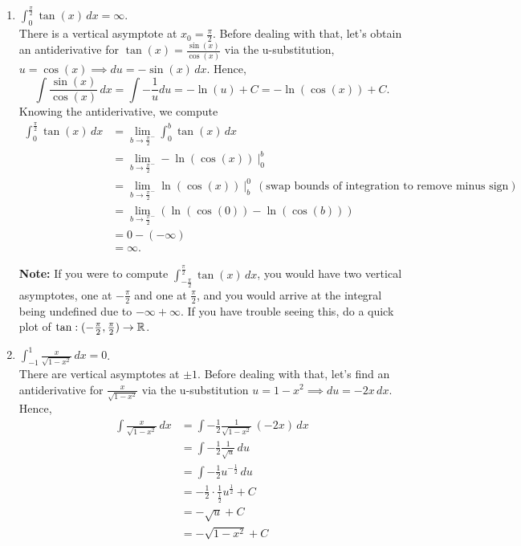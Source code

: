 \begin{enumerate}
    \item \Ans \quad  $\int_0 ^\frac{\pi}{2} \tan(x) \, dx =\infty$. \\

    There is a vertical asymptote at $x_0 = \frac{\pi}{2}$. Before dealing with that, let's obtain an antiderivative for $\tan(x) = \frac{\sin(x)}{\cos(x)}$ via the u-substitution, $u = \cos(x) \implies du = -\sin(x) \, dx$. Hence,
    $$ \int \frac{\sin(x)}{\cos(x)}\, dx = \int -\frac{1}{u} du = -\ln(u) +C = -\ln(\cos(x)) + C.$$
    Knowing the antiderivative, we compute
    \begin{align*}
        \int_{0}^{ \frac{\pi}{2} } \tan(x) \, dx &= \lim_{ b \to \frac{\pi}{2}^- }  \int_{0}^{b} \tan(x) \, dx  \\[1em] 
        &= \lim_{ b \to \frac{\pi}{2}^- }  -\ln(\cos(x)) ~\bigg|_{0}^{b} \\[1em]
         &= \lim_{b \to \frac{\pi}{2}^-}  \ln(\cos(x)) ~\bigg|_{b}^0 ~~(\text{swap bounds of integration to remove minus sign}) \\[1em]
         &=  \lim_{b \to \frac{\pi}{2}^-} \left( \ln(\cos(0))  - \ln(\cos(b))  \right) \\[1em]
         &= 0 - (-\infty)\\
         &=\infty.         
    \end{align*}

    \textbf{Note:} If you were to compute $\displaystyle \int_{-\frac{\pi}{2}}^{ \frac{\pi}{2} } \tan(x) \, dx $, you would have two vertical asymptotes, one at $ -\frac{\pi}{2}$ and one at  $ \frac{\pi}{2}$, and you would arrive at the integral being undefined due to $-\infty + \infty$. If you have trouble seeing this, do a quick plot of $\tan: (-\frac{\pi}{2}, \frac{\pi}{2}) \to \mathbb R$.

    \item \Ans \quad $\int_{-1} ^1 \frac{x}{\sqrt{1 - x^2}} \, dx = 0$.\\

    There are vertical asymptotes at $\pm 1$. Before dealing with that, let's find an antiderivative for $\frac{x}{\sqrt{1 - x^2}}$ via the u-substitution $u = 1-x^2 \implies du = -2x \, dx$. Hence, 
    \begin{align*}
        \int \frac{x}{\sqrt{1 - x^2}} \, dx & = \int-\frac{1}{2} \frac{1}{\sqrt{1 - x^2}} \,(-2x)\, dx \\[1em]
        &=\int -\frac{1}{2}\frac{1}{\sqrt{u}} \, du \\[1em]
        &= \int -\frac{1}{2} u^{-\frac{1}{2}} \, du  \\[1em]
        &=  -\frac{1}{2} \cdot \frac{1}{\frac{1}{2}}u^{\frac{1}{2}} + C \\[1em]
        & = - \sqrt{u} + C \\
        & = - \sqrt{1-x^2} + C \\
    \end{align*}


\end{enumerate}
